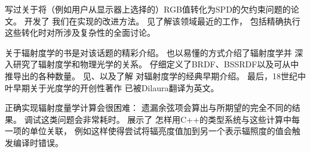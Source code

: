 \citet{31468}写过关于将（例如用户从显示器上选择的）RGB值转化为SPD的欠约束问题的论文。
\citet{10.1080/10867651.1999.10487511}开发了
我们在实现的改进方法。
见\citet{10.1111/cgf.12676}了解该领域最近的工作，
包括精确执行这些转化时对所涉及复杂性的全面讨论。

\citet{9100708}关于辐射度学的书是对该话题的精彩介绍。
\citet{PREISENDORFER19653}也以易懂的方式介绍了辐射度学并
深入研究了辐射度学和物理光学的关系。
\citet{Nicodemus1977}仔细定义了BRDF、BSSRDF以及可从中推导出的各种数量。
见\citet{Moon1936}、\citet{Moon1948}以及\citet{10.1002/sapm193918151}了解
对辐射度学的经典早期介绍。
最后，18世纪中叶\citet{Lambert1760}早期关于光度学的开创性著作
已被Dilaura翻译为英文。

正确实现辐射度量学计算会很困难：
遗漏余弦项会算出与所期望的完全不同的结果。
调试这类问题会非常耗时。
\citet{10.1111/j.1467-8659.2010.01722.x}展示了
怎样用C++的类型系统与这些计算中每一项的单位关联，
例如这样使得尝试将辐亮度值加到另一个表示辐照度的值会触发编译时错误。